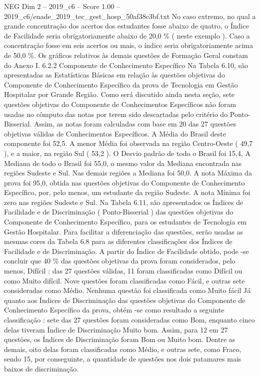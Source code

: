 \begin{textsample}{NEG Dim 2 – 2019\_c6 – Score 1.00 – 2019\_c6/enade\_2019\_tec\_gest\_hosp\_50af38c3bf.txt}
No caso extremo, no qual a grande concentração dos acertos dos estudantes fosse abaixo de quatro, o Índice de Facilidade seria obrigatoriamente abaixo de 20,0 \% ( neste exemplo ).
Caso a concentração fosse em seis acertos ou mais, o índice seria obrigatoriamente acima de 50,0 \%.
Os gráficos relativos às demais questões de Formação Geral constam do Anexo I. 6.2.2 Componente de Conhecimento Específico Na Tabela 6.10, são apresentadas as Estatísticas Básicas em relação às questões objetivas do Componente de Conhecimento Específico da prova de Tecnologia em Gestão Hospitalar por Grande Região.
Como será discutido ainda nesta seção, sete questões objetivas do Componente de Conhecimentos Específicos não foram usadas no cômputo das notas por terem sido descartadas pelo critério do Ponto-Bisserial.
Assim, as notas foram calculadas com base em 20 das 27 questões objetivas válidas de Conhecimentos Específicos.
A Média do Brasil deste componente foi 52,5.
A menor Média foi observada na região Centro-Oeste ( 49,7 ), e a maior, na região Sul ( 53,2 ).
O Desvio padrão de todo o Brasil foi 15,4, A Mediana de todo o Brasil foi 55,0, o mesmo valor da Mediana encontrada nas regiões Sudeste e Sul.
Nas demais regiões a Mediana foi 50,0.
A nota Máxima da prova foi 95,0, obtida nas questões objetivas do Componente de Conhecimento Específico, por, pelo menos, um estudante da região Sudeste.
A nota Mínima foi zero nas regiões Sudeste e Sul.
Na Tabela 6.11, são apresentados os Índices de Facilidade e de Discriminação ( Ponto-Bisserial ) das questões objetivas do Componente de Conhecimento Específico, para os estudantes de Tecnologia em Gestão Hospitalar.
Para facilitar a diferenciação das questões, serão usadas as mesmas cores da Tabela 6.8 para as diferentes classificações dos Índices de Facilidade e de Discriminação.
A partir do Índice de Facilidade obtido, pode -se concluir que 40 \% das questões objetivas da prova foram considerados, pelo menos, Difícil : das 27 questões válidas, 11 foram classificadas como Difícil ou como Muito difícil.
Nove questões foram classificadas como Fácil, e outras sete consideradas como Médio.
Nenhuma questão foi classificada como Muito fácil Já quanto aos Índices de Discriminação das questões objetivas do Componente de Conhecimento Específico da prova, obtém -se como resultado a seguinte classificação : sete das 27 questões foram consideradas como Bom, enquanto cinco delas tiveram Índice de Discriminação Muito bom.
Assim, para 12 em 27 questões, os Índices de Discriminação foram Bom ou Muito bom.
Dentre as demais, oito delas foram classificadas como Médio, e outras sete, como Fraco, sendo 15, por conseguinte, a quantidade de questões nos dois patamares mais baixos de discriminação.

\end{textsample}
